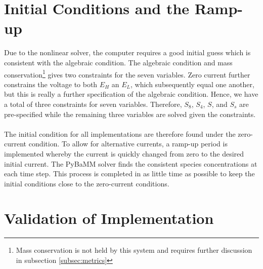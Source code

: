 \documentclass[11pt,twoside,a4paper]{article}
\begin{document}
\section{Initial Conditions and the Ramp-up}
Due to the nonlinear solver, the computer requires a good initial guess which is consistent with the algebraic condition. The algebraic condition and mass conservation\footnote{Mass conservation is not held by this system and requires further discussion in subsection \ref{subsec:metrics}} gives two constraints for the seven variables. Zero current further constrains the voltage to both $E_H$ an $E_L$, which subsequently equal one another, but this is really a further specification of the algebraic condition. Hence, we have a total of three constraints for seven variables. Therefore, $S_8$, $S_4$, $S$, and $S_s$ are pre-specified while the remaining three variables are solved given the constraints. \\ \\
The initial condition for all implementations are therefore found under the zero-current condition. To allow for alternative currents, a ramp-up period is implemented whereby the current is quickly changed from zero to the desired initial current. The PyBaMM solver finds the consistent species concentrations at each time step. This process is completed in as little time as possible to keep the initial conditions close to the zero-current conditions.

\section{Validation of Implementation}
\end{document}
